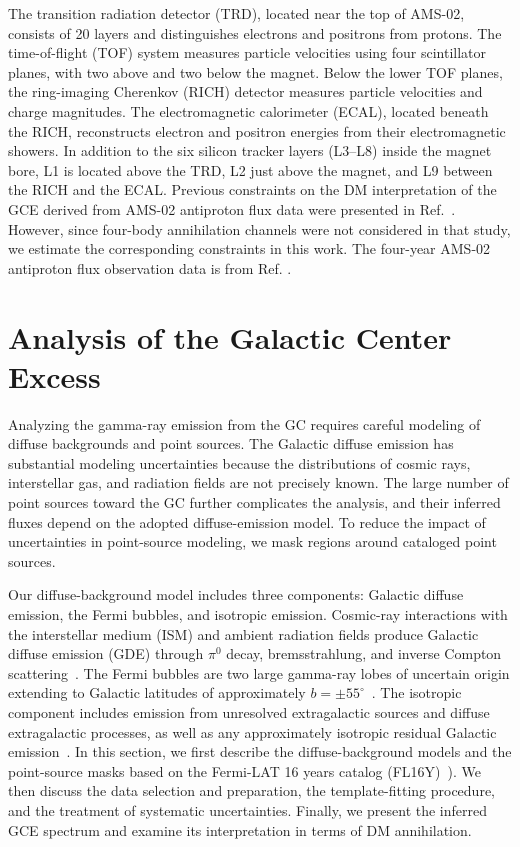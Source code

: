 \documentclass[superscriptaddress,
showpacs,preprintnumbers,nofootinbib,eqsecnum,amsmath,amssymb,aps,11pt, groupedaddress, floatfix]{revtex4-2}
\begin{document}
The transition radiation detector (TRD), located near the top of AMS-02, consists of 20 layers and distinguishes electrons and positrons from protons.
The time-of-flight (TOF) system measures particle velocities using four scintillator planes, with two above and two below the magnet.
Below the lower TOF planes, the ring-imaging Cherenkov (RICH) detector measures particle velocities and charge magnitudes.
The electromagnetic calorimeter (ECAL), located beneath the RICH, reconstructs electron and positron energies from their electromagnetic showers.
In addition to the six silicon tracker layers (L3--L8) inside the magnet bore, L1 is located above the TRD, L2 just above the magnet, and L9 between the RICH and the ECAL.
Previous constraints on the DM interpretation of the GCE derived from AMS-02 antiproton flux data were presented in Ref.~\cite{DiMauro:2021qcf}. However, since four-body annihilation channels were not considered in that study, we estimate the corresponding constraints in this work. 
The four-year AMS-02 antiproton flux observation data is from Ref. \cite{AMS:2016oqu}.



\section{Analysis of the Galactic Center Excess}
\label{sec:GCE}


Analyzing the gamma-ray emission from the GC requires careful modeling of diffuse backgrounds and point sources. 
The Galactic diffuse emission has substantial modeling uncertainties because the distributions of cosmic rays, interstellar gas, and radiation fields are not precisely known. 
The large number of point sources toward the GC further complicates the analysis, and their inferred fluxes depend on the adopted diffuse-emission model. 
To reduce the impact of uncertainties in point-source modeling, we mask regions around cataloged point sources.

Our diffuse-background model includes three components: Galactic diffuse emission, the Fermi bubbles, and isotropic emission. 
Cosmic-ray interactions with the interstellar medium (ISM) and ambient radiation fields produce Galactic diffuse emission (GDE) through $\pi^0$ decay, bremsstrahlung, and inverse Compton scattering~\cite{Fermi-LAT:2012edv, Moskalenko:2001ya, Strong:1998fr, Kamae:2006bf, Koch:1959zz, Blumenthal:1970gc, Jones:1968zza}.
The Fermi bubbles are two large gamma-ray lobes of uncertain origin extending to Galactic latitudes of approximately $b=\pm55^\circ$~\cite{Su:2010qj, Fermi-LAT:2014sfa}.
The isotropic component includes emission from unresolved extragalactic sources and diffuse extragalactic processes, as well as any approximately isotropic residual Galactic emission~\cite{Fermi-LAT:2014ryh}.
In this section, we first describe the diffuse-background models and the point-source masks based on the Fermi-LAT 16 years catalog (FL16Y)~\cite{Ballet:2026kpq}). 
We then discuss the data selection and preparation, the template-fitting procedure, and the treatment of systematic uncertainties. 
Finally, we present the inferred GCE spectrum and examine its interpretation in terms of DM annihilation.
\end{document}

